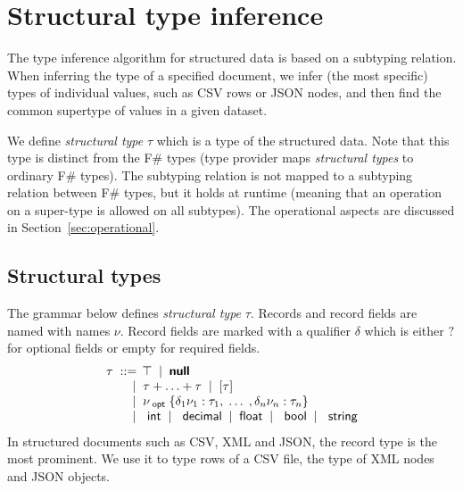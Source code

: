 \documentclass[10pt]{sigplanconf}
\newcommand{\lsep}[0]{\;\; | \;\;}
\newcommand{\kvd}[1]{\textbf{\sffamily #1}}
\newcommand{\ident}[1]{\textnormal{\sffamily #1}}
\begin{document}

\section{Structural type inference}
\label{sec:inference}

The type inference algorithm for structured data is based on a subtyping relation. When inferring 
the type of a specified document, we infer (the most specific) types of individual values, such as
CSV rows or JSON nodes, and then find the common supertype of values in a given dataset.

We define \emph{structural type} $\tau$ which is a type of the structured data. Note that this type
is distinct from the F\# types (type provider maps \emph{structural types} to ordinary F\# types). 
The subtyping relation is not mapped to a subtyping relation between F\# types, but it holds at 
runtime (meaning that an operation on a super-type is allowed on all subtypes). The operational 
aspects are discussed in Section~\ref{sec:operational}.


\subsection{Structural types}
\label{sec:inference-types}

The grammar below defines \emph{structural type} $\tau$. Records and record fields are named with
names $\nu$. Record fields are marked with a qualifier $\delta$ which is either $?$ for optional
fields or empty for required fields.
%
\begin{equation*}
\begin{array}{rl}
\multicolumn{2}{l}{
  \tau \; ::= \, \top \lsep \kvd{null}
}\\  
\;\;  &\lsep \tau + \ldots + \tau \lsep [\tau]\\
      &\lsep \nu_{\ident{opt}} \; \{ \delta_1 \nu_1 : \tau_1, \; \ldots \; , \delta_n \nu_n : \tau_n \} \\
      &\lsep \ident{int} \lsep \ident{decimal} \lsep \ident{float} \lsep \ident{bool} \lsep \ident{string} \\
\end{array}
\end{equation*}
%
In structured documents such as CSV, XML and JSON, the record type is the most prominent. We use 
it to type rows of a CSV file, the type of XML nodes and JSON objects.
\end{document}
